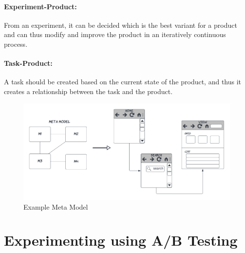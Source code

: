 \paragraph{Experiment-Product:} From an experiment, it can be decided which is the best variant for a product and can thus modify and improve the product in an iteratively continuous process.
\paragraph{Task-Product:} A task should be created based on the current state of the product, and thus it creates a relationship between the task and the product.

\begin{figure}[bt]
	\centering
  \includegraphics[width=1.05\textwidth]{images/solution-ideas/MetaModel.png}
	\caption{Example Meta Model}
	\label{solutionideas:fig:metamodel}
\end{figure}
\section{Experimenting using A/B Testing}

